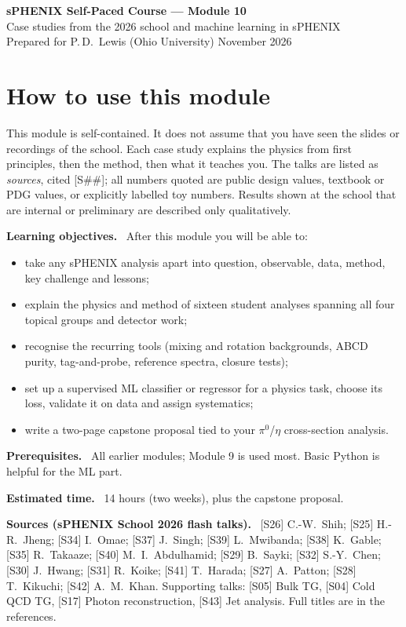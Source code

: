 \documentclass[11pt,letterpaper]{article}
\newcommand{\hd}[1]{\par\smallskip\noindent\textbf{\color{blue!50!black}#1.}\ }
\begin{document}
\begin{center}{\LARGE\bfseries sPHENIX Self-Paced Course --- Module 10}\\[4pt]
{\Large Case studies from the 2026 school and machine learning in sPHENIX}\\[8pt]
Prepared for P.\,D.\ Lewis (Ohio University) \quad November 2026\end{center}

\tableofcontents
\newpage

\section*{How to use this module}
This module is self-contained. It does not assume that you have seen the slides or recordings of the school. Each case study
explains the physics from first principles, then the method, then what it teaches you. The talks are listed as \emph{sources}, cited
[S\#\#]; all numbers quoted are public design values, textbook or PDG values, or explicitly labelled toy numbers. Results shown at the
school that are internal or preliminary are described only qualitatively.

\hd{Learning objectives} After this module you will be able to:
\begin{itemize}
\item take any sPHENIX analysis apart into question, observable, data, method, key challenge and lessons;
\item explain the physics and method of sixteen student analyses spanning all four topical groups and detector work;
\item recognise the recurring tools (mixing and rotation backgrounds, ABCD purity, tag-and-probe, reference spectra, closure tests);
\item set up a supervised ML classifier or regressor for a physics task, choose its loss, validate it on data and assign systematics;
\item write a two-page capstone proposal tied to your $\pi^0$/$\eta$ cross-section analysis.
\end{itemize}
\hd{Prerequisites} All earlier modules; Module 9 is used most. Basic Python is helpful for the ML part.

\hd{Estimated time} 14 hours (two weeks), plus the capstone proposal.

\hd{Sources (sPHENIX School 2026 flash talks)} [S26] C.-W.\ Shih; [S25] H.-R.\ Jheng; [S34] I.\ Omae; [S37] J.\ Singh;
[S39] L.\ Mwibanda; [S38] K.\ Gable; [S35] R.\ Takaaze; [S40] M.\ I.\ Abdulhamid; [S29] B.\ Sayki; [S32] S.-Y.\ Chen;
[S30] J.\ Hwang; [S31] R.\ Koike; [S41] T.\ Harada; [S27] A.\ Patton; [S28] T.\ Kikuchi; [S42] A.\ M.\ Khan. Supporting talks:
[S05] Bulk TG, [S04] Cold QCD TG, [S17] Photon reconstruction, [S43] Jet analysis. Full titles are in the references.
\end{document}
